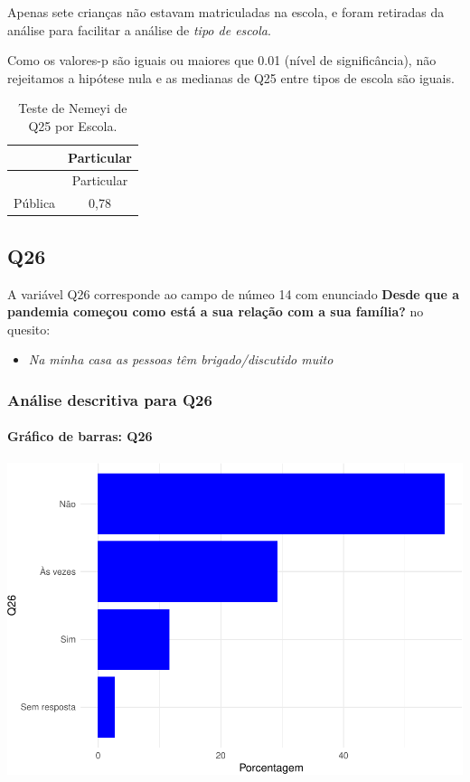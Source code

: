 \documentclass[]{article}
\providecommand{\tightlist}{%
  \setlength{\itemsep}{0pt}\setlength{\parskip}{0pt}}
\let\oldparagraph\paragraph
\renewcommand{\paragraph}[1]{\oldparagraph{#1}\mbox{}}
\begin{document}
Apenas sete crianças não estavam matriculadas na escola, e foram retiradas da análise para facilitar a análise de \emph{tipo de escola}.

Como os valores-p são iguais ou maiores que 0.01 (nível de significância), não rejeitamos a hipótese nula e as medianas de Q25 entre tipos de escola são iguais.

\begin{longtable}[]{@{}lc@{}}
\caption{\label{tab:unnamed-chunk-711}Teste de Nemeyi de Q25 por Escola.}\tabularnewline
\toprule
& Particular\tabularnewline
\midrule
\endfirsthead
\toprule
& Particular\tabularnewline
\midrule
\endhead
Pública & 0,78\tabularnewline
\bottomrule
\end{longtable}

\cleardoublepage

\hypertarget{q26}{%
\subsection{Q26}\label{q26}}

A variável Q26 corresponde ao campo de númeo 14 com enunciado \textbf{Desde que a pandemia começou como está a sua relação com a sua família?} no quesito:

\begin{itemize}
\tightlist
\item
  \emph{Na minha casa as pessoas têm brigado/discutido muito}
\end{itemize}

\hypertarget{anuxe1lise-descritiva-para-q26}{%
\subsubsection{Análise descritiva para Q26}\label{anuxe1lise-descritiva-para-q26}}

\hypertarget{gruxe1fico-de-barras-q26}{%
\paragraph{Gráfico de barras: Q26}\label{gruxe1fico-de-barras-q26}}

\begin{center}\includegraphics[width=0.75\linewidth]{relatorio_covid19_files/figure-latex/unnamed-chunk-718-1} \end{center}
\end{document}
